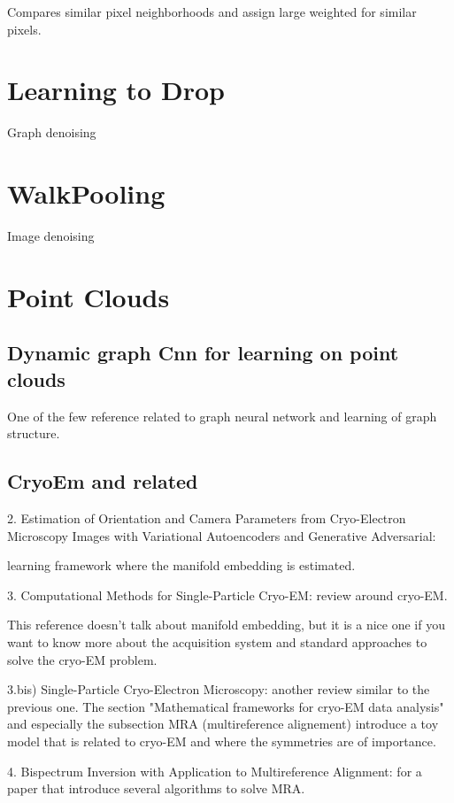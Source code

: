 Compares similar pixel neighborhoods and assign large weighted for similar pixels.




\section{Learning to Drop}
Graph denoising


\section{WalkPooling}
Image denoising

\section{Point Clouds}
\subsection{Dynamic graph Cnn for learning on point clouds}
One of the few reference related to graph neural network and learning of graph structure. 


\subsection{CryoEm and related}
2. Estimation of Orientation and Camera Parameters from Cryo-Electron Microscopy Images with Variational Autoencoders and Generative Adversarial: 

learning framework where the manifold embedding is estimated.

3. Computational Methods for Single-Particle Cryo-EM: 
review around cryo-EM. 

This reference doesn't talk about manifold embedding, but it is a nice one if you want to know more about 
the acquisition system and standard approaches to solve the cryo-EM problem.


3.bis) Single-Particle Cryo-Electron Microscopy: 
another review similar to the previous one. The section "Mathematical frameworks for cryo-EM data analysis" 
and especially the subsection MRA (multireference alignement) introduce 
a toy model that is related to cryo-EM and where the symmetries are of importance. 

4. Bispectrum Inversion with Application to Multireference Alignment: 
for a paper that introduce several algorithms to solve MRA.